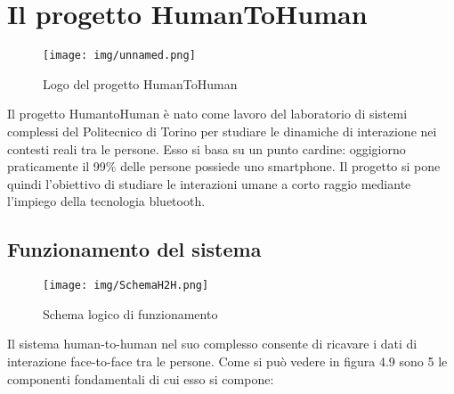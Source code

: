 \documentclass[12pt,twoside]{report}
\begin{document}
	\section{Il progetto HumanToHuman}
	
	\begin{figure}[h]
	    \centering
	    \texttt{[image: img/unnamed.png]}
	    \centering
	    \caption{Logo del progetto HumanToHuman}
	    \label{fig:my_label}
	\end{figure}
	
	Il progetto HumantoHuman è nato come lavoro del laboratorio di sistemi complessi del Politecnico di Torino per studiare le dinamiche di interazione nei contesti reali tra le persone. Esso si basa su un punto cardine: oggigiorno praticamente il 99\% delle persone possiede uno smartphone. Il progetto si pone quindi l'obiettivo di studiare le interazioni umane a corto raggio mediante l'impiego della tecnologia bluetooth. 
	
	
	\subsection{Funzionamento del sistema}
	
	\begin{figure}[h]
	    \centering
	    \texttt{[image: img/SchemaH2H.png]}
	    \centering
	    \caption{Schema logico di funzionamento}
	    \label{fig:my_label}
	\end{figure}
	
	Il sistema human-to-human nel suo complesso consente di ricavare i dati di interazione face-to-face tra le persone. Come si può vedere in figura 4.9 sono 5 le componenti fondamentali di cui esso si compone:
	
\end{document}
